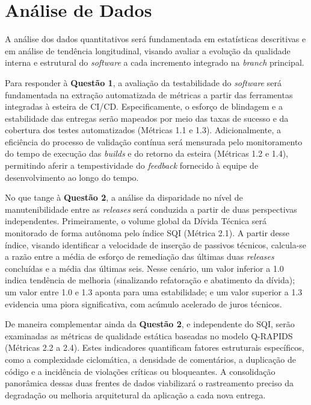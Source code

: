 \section{Análise de Dados}

A análise dos dados quantitativos será fundamentada em estatísticas descritivas e em análise de tendência longitudinal, visando avaliar a evolução da qualidade interna e estrutural do \textit{software} a cada incremento integrado na \textit{branch} principal. 

Para responder à \textbf{Questão 1}, a avaliação da testabilidade do \textit{software} será fundamentada na extração automatizada de métricas a partir das ferramentas integradas à esteira de CI/CD. Especificamente, o esforço de blindagem e a estabilidade das entregas serão mapeados por meio das taxas de sucesso e da cobertura dos testes automatizados (Métricas 1.1 e 1.3). Adicionalmente, a eficiência do processo de validação contínua será mensurada pelo monitoramento do tempo de execução das \textit{builds} e do retorno da esteira (Métricas 1.2 e 1.4), permitindo aferir a tempestividade do \textit{feedback} fornecido à equipe de desenvolvimento ao longo do tempo.

No que tange à \textbf{Questão 2}, a análise da disparidade no nível de manutenibilidade entre as \textit{releases} será conduzida a partir de duas perspectivas independentes. Primeiramente, o volume global da Dívida Técnica será monitorado de forma autônoma pelo índice SQI (Métrica 2.1). A partir desse índice, visando identificar a velocidade de inserção de passivos técnicos, calcula-se a razão entre a média de esforço de remediação das últimas duas \textit{releases} concluídas e a média das últimas seis. Nesse cenário, um valor inferior a 1.0 indica tendência de melhoria (sinalizando refatoração e abatimento da dívida); um valor entre 1.0 e 1.3 aponta para uma estabilidade; e um valor superior a 1.3 evidencia uma piora significativa, com acúmulo acelerado de juros técnicos.

De maneira complementar ainda da \textbf{Questão 2}, e independente do SQI, serão examinadas as métricas de qualidade estática baseadas no modelo Q-RAPIDS (Métricas 2.2 a 2.4). Estes indicadores quantificam fatores estruturais específicos, como a complexidade ciclomática, a densidade de comentários, a duplicação de código e a incidência de violações críticas ou bloqueantes. A consolidação panorâmica dessas duas frentes de dados viabilizará o rastreamento preciso da degradação ou melhoria arquitetural da aplicação a cada nova entrega.

